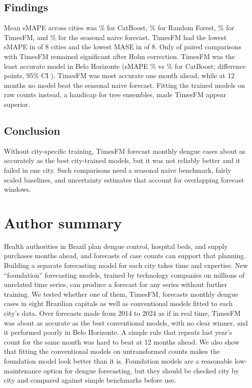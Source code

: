 \documentclass[10pt,letterpaper]{article}
\begin{document}
\subsection*{Findings}
Mean sMAPE across cities was \% for CatBoost, \% for Random Forest, \% for TimesFM, and \% for the seasonal naive forecast. TimesFM had the lowest sMAPE in  of 8 cities and the lowest MASE in  of 8. Only  of  paired comparisons with TimesFM remained significant after Holm correction. TimesFM was the least accurate model in Belo Horizonte (sMAPE \% vs \% for CatBoost; difference  points, 95\% CI ). TimesFM was most accurate one month ahead, while at 12 months no model beat the seasonal naive forecast. Fitting the trained models on raw counts instead, a handicap for tree ensembles, made TimesFM appear superior.

\subsection*{Conclusion}
Without city-specific training, TimesFM forecast monthly dengue cases about as accurately as the best city-trained models, but it was not reliably better and it failed in one city. Such comparisons need a seasonal naive benchmark, fairly scaled baselines, and uncertainty estimates that account for overlapping forecast windows.

\section*{Author summary}
Health authorities in Brazil plan dengue control, hospital beds, and supply purchases months ahead, and forecasts of case counts can support that planning. Building a separate forecasting model for each city takes time and expertise. New ``foundation'' forecasting models, trained by technology companies on millions of unrelated time series, can produce a forecast for any series without further training. We tested whether one of them, TimesFM, forecasts monthly dengue cases in eight Brazilian capitals as well as conventional models fitted to each city's data. Over forecasts made from 2014 to 2024 as if in real time, TimesFM was about as accurate as the best conventional models, with no clear winner, and it performed poorly in Belo Horizonte. A simple rule that repeats last year's count for the same month was hard to beat at 12 months ahead. We also show that fitting the conventional models on untransformed counts makes the foundation model look better than it is. Foundation models are a reasonable low-maintenance option for dengue forecasting, but they should be checked city by city and compared against simple benchmarks before use.
\end{document}
